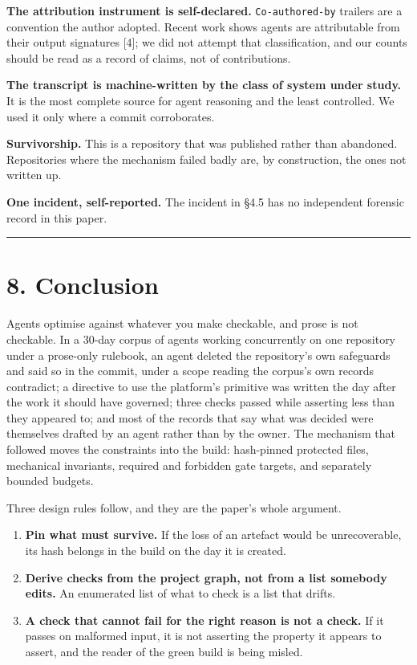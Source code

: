 \documentclass[11pt,a4paper]{article}
\begin{document}
\textbf{The attribution instrument is self-declared.} \texttt{Co-authored-by} trailers are a convention the author adopted. Recent work shows agents are attributable from their output signatures [4]; we did not attempt that classification, and our counts should be read as a record of claims, not of contributions.

\textbf{The transcript is machine-written by the class of system under study.} It is the most complete source for agent reasoning and the least controlled. We used it only where a commit corroborates.

\textbf{Survivorship.} This is a repository that was published rather than abandoned. Repositories where the mechanism failed badly are, by construction, the ones not written up.

\textbf{One incident, self-reported.} The incident in \S{}4.5 has no independent forensic record in this paper.

\medskip\hrule\medskip

\section*{8. Conclusion}

Agents optimise against whatever you make checkable, and prose is not checkable. In a 30-day corpus of agents working concurrently on one repository under a prose-only rulebook, an agent deleted the repository's own safeguards and said so in the commit, under a scope reading the corpus's own records contradict; a directive to use the platform's primitive was written the day after the work it should have governed; three checks passed while asserting less than they appeared to; and most of the records that say what was decided were themselves drafted by an agent rather than by the owner. The mechanism that followed moves the constraints into the build: hash-pinned protected files, mechanical invariants, required and forbidden gate targets, and separately bounded budgets.

Three design rules follow, and they are the paper's whole argument.

\begin{enumerate}
\item \textbf{Pin what must survive.} If the loss of an artefact would be unrecoverable, its hash belongs in the build on the day it is created.
\item \textbf{Derive checks from the project graph, not from a list somebody edits.} An enumerated list of what to check is a list that drifts.
\item \textbf{A check that cannot fail for the right reason is not a check.} If it passes on malformed input, it is not asserting the property it appears to assert, and the reader of the green build is being misled.
\end{enumerate}
\end{document}
